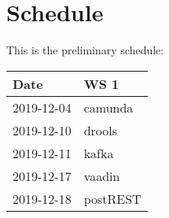 \section*{Schedule}

This is the preliminary schedule:

\begin{center}
  \begin{tabular}{|l|l|}\hline
    \textbf{Date}& \textbf{WS 1}\\\hline
    2019-12-04 & camunda \\\hline
    2019-12-10 & drools \\\hline
    2019-12-11 & kafka \\\hline
    2019-12-17 & vaadin\\\hline
    2019-12-18 & postREST\\\hline
  \end{tabular}
\end{center}


